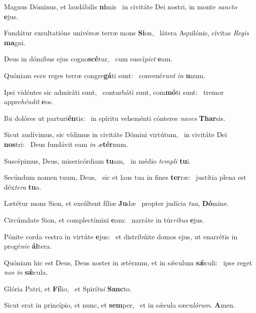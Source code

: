 \item Magnus Dóminus, et laudábilis \textbf{ni}mis~\psstar{} in civitáte Dei nostri, in monte \textit{sancto} \textbf{e}jus.
\item Fundátur exsultatióne univérsæ terræ mons \textbf{Si}on,~\psstar{} látera Aquilónis, cívitas \textit{Regis} \textbf{ma}gni.
\item Deus in dómibus ejus cogno\textbf{scé}tur,~\psstar{} cum suscí\textit{piet} \textbf{e}am.
\item Quóniam ecce reges terræ congre\textbf{gá}ti sunt:~\psstar{} convené\textit{runt} \textit{in} \textbf{u}num.
\item Ipsi vidéntes sic admiráti sunt,~\pscross{} conturbáti sunt, com\textbf{mó}ti sunt:~\psstar{} tremor appre\textit{héndit} \textbf{e}os.
\item Ibi dolóres ut parturi\textbf{én}tis:~\psstar{} in spíritu veheménti cónteres \textit{naves} \textbf{Thar}sis.
\item Sicut audívimus, sic vídimus in civitáte Dómini virtútum,~\pscross{} in civitáte Dei \textbf{nos}tri:~\psstar{} Deus fundávit eam \textit{in} \textit{æ}\textbf{tér}num.
\item Suscépimus, Deus, misericórdiam \textbf{tu}am,~\psstar{} in médio \textit{templi} \textbf{tu}i.
\item Secúndum nomen tuum, Deus,~\pscross{} sic et laus tua in fines \textbf{ter}ræ:~\psstar{} justítia plena est déx\textit{tera} \textbf{tu}a.
\item Lætétur mons Sion, et exsúltent fíliæ \textbf{Ju}dæ~\psstar{} propter judícia \textit{tua}, \textbf{Dó}mine.
\item Circúmdate Sion, et complectímini \textbf{e}am:~\psstar{} narráte in túr\textit{ribus} \textbf{e}jus.
\item Pónite corda vestra in virtúte \textbf{e}jus:~\psstar{} et distribúite domos ejus, ut enarrétis in progé\textit{nie} \textbf{ál}tera.
\item Quóniam hic est Deus, Deus noster in ætérnum, et in sǽculum \textbf{sǽ}culi:~\psstar{} ipse reget \textit{nos} \textit{in} \textbf{sǽ}cula.
\item Glória Patri, et \textbf{Fí}lio,~\psstar{} et Spirí\textit{tui} \textbf{Sanc}to.
\item Sicut erat in princípio, et nunc, et \textbf{sem}per,~\psstar{} et in sǽcula sæcu\textit{lórum}. \textbf{A}men.
